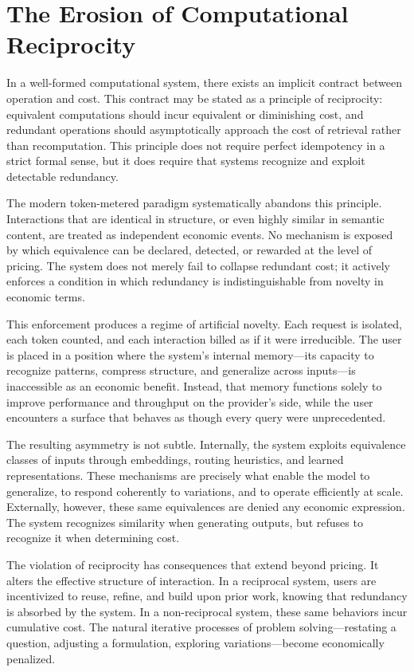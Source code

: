 \documentclass[12pt, oneside]{article}
\begin{document}
\section{The Erosion of Computational Reciprocity}

In a well-formed computational system, there exists an implicit contract between operation and cost. This contract may be stated as a principle of reciprocity: equivalent computations should incur equivalent or diminishing cost, and redundant operations should asymptotically approach the cost of retrieval rather than recomputation. This principle does not require perfect idempotency in a strict formal sense, but it does require that systems recognize and exploit detectable redundancy.

The modern token-metered paradigm systematically abandons this principle. Interactions that are identical in structure, or even highly similar in semantic content, are treated as independent economic events. No mechanism is exposed by which equivalence can be declared, detected, or rewarded at the level of pricing. The system does not merely fail to collapse redundant cost; it actively enforces a condition in which redundancy is indistinguishable from novelty in economic terms.

This enforcement produces a regime of artificial novelty. Each request is isolated, each token counted, and each interaction billed as if it were irreducible. The user is placed in a position where the system's internal memory---its capacity to recognize patterns, compress structure, and generalize across inputs---is inaccessible as an economic benefit. Instead, that memory functions solely to improve performance and throughput on the provider's side, while the user encounters a surface that behaves as though every query were unprecedented.

The resulting asymmetry is not subtle. Internally, the system exploits equivalence classes of inputs through embeddings, routing heuristics, and learned representations. These mechanisms are precisely what enable the model to generalize, to respond coherently to variations, and to operate efficiently at scale. Externally, however, these same equivalences are denied any economic expression. The system recognizes similarity when generating outputs, but refuses to recognize it when determining cost.

The violation of reciprocity has consequences that extend beyond pricing. It alters the effective structure of interaction. In a reciprocal system, users are incentivized to reuse, refine, and build upon prior work, knowing that redundancy is absorbed by the system. In a non-reciprocal system, these same behaviors incur cumulative cost. The natural iterative processes of problem solving---restating a question, adjusting a formulation, exploring variations---become economically penalized.
\end{document}
